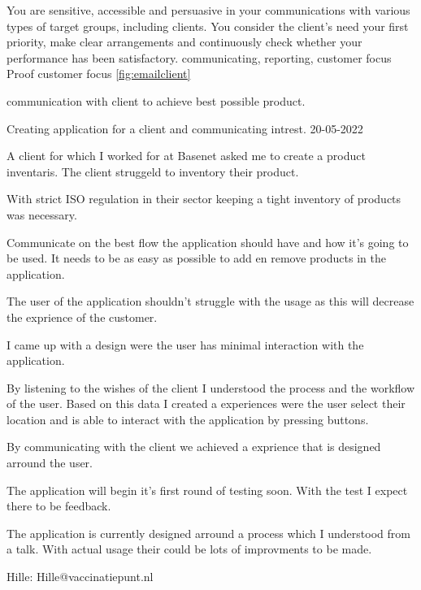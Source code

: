 \competentie
{%
	\competentieformulier
	{%
		You are sensitive, accessible and persuasive in your communications with various types of target groups, including clients. You consider the client's need your first priority, make clear arrangements and continuously check whether your performance has been satisfactory.
	}
	{%
		communicating,%
		reporting,%
		customer focus%
	}
	{%
		Proof
	}
	{%
		customer focus
	}
	{%
		\ref{fig:emailclient}
	}
}
{%
	\bewijs
	{%
		communication with client to achieve best possible product.
	}
	{%
		\starr
		{%
			Creating application for a client and communicating intrest.
		}
		{%
			20-05-2022
		}
		{%
			A client for which I worked for at Basenet asked me to create a product inventaris.
			The client struggeld to inventory their product.

			With strict ISO regulation in their sector keeping a tight inventory of products was necessary.

		}
		{%
			Communicate on the best flow the application should have and how it's going to be used.
			It needs to be as easy as possible to add en remove products in the application.

			The user of the application shouldn't struggle with the usage as this will decrease the exprience of the customer.
		}
		{%
			I came up with a design were the user has minimal interaction with the application.

			By listening to the wishes of the client I understood the process and the workflow of the user.
			Based on this data I created a experiences were the user select their location and is able to interact with the application by pressing buttons.

		}
		{%
			By communicating with the client we achieved a exprience that is designed arround the user.
		}
		{%
			The application will begin it's first round of testing soon.
			With the test I expect there to be feedback.

			The application is currently designed arround a process which I understood from a talk.
			With actual usage their could be lots of improvments to be made.
		}
		{
			Hille: Hille@vaccinatiepunt.nl
		}
	}
	{%

}}
